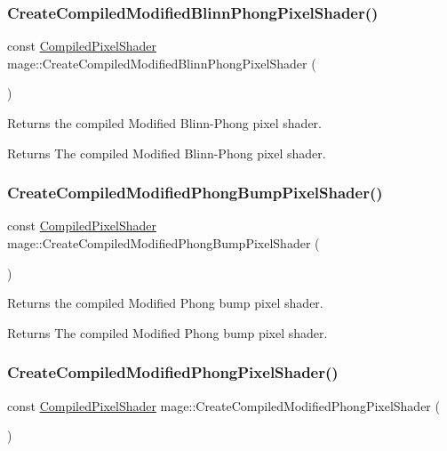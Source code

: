 \subsubsection{\texorpdfstring{Create\+Compiled\+Modified\+Blinn\+Phong\+Pixel\+Shader()}{CreateCompiledModifiedBlinnPhongPixelShader()}}
{\footnotesize\ttfamily const \hyperlink{structmage_1_1_compiled_pixel_shader}{Compiled\+Pixel\+Shader} mage\+::\+Create\+Compiled\+Modified\+Blinn\+Phong\+Pixel\+Shader (\begin{DoxyParamCaption}{ }\end{DoxyParamCaption})}

Returns the compiled Modified Blinn-\/\+Phong pixel shader.

\begin{DoxyReturn}{Returns}
The compiled Modified Blinn-\/\+Phong pixel shader. 
\end{DoxyReturn}
\hypertarget{namespacemage_a5f7ccb26f848b698329ffbf63a6fdc18}{}\label{namespacemage_a5f7ccb26f848b698329ffbf63a6fdc18} 
\subsubsection{\texorpdfstring{Create\+Compiled\+Modified\+Phong\+Bump\+Pixel\+Shader()}{CreateCompiledModifiedPhongBumpPixelShader()}}
{\footnotesize\ttfamily const \hyperlink{structmage_1_1_compiled_pixel_shader}{Compiled\+Pixel\+Shader} mage\+::\+Create\+Compiled\+Modified\+Phong\+Bump\+Pixel\+Shader (\begin{DoxyParamCaption}{ }\end{DoxyParamCaption})}

Returns the compiled Modified Phong bump pixel shader.

\begin{DoxyReturn}{Returns}
The compiled Modified Phong bump pixel shader. 
\end{DoxyReturn}
\hypertarget{namespacemage_abe317a5b89996e746b3c324683357dbd}{}\label{namespacemage_abe317a5b89996e746b3c324683357dbd} 
\subsubsection{\texorpdfstring{Create\+Compiled\+Modified\+Phong\+Pixel\+Shader()}{CreateCompiledModifiedPhongPixelShader()}}
{\footnotesize\ttfamily const \hyperlink{structmage_1_1_compiled_pixel_shader}{Compiled\+Pixel\+Shader} mage\+::\+Create\+Compiled\+Modified\+Phong\+Pixel\+Shader (\begin{DoxyParamCaption}{ }\end{DoxyParamCaption})}

